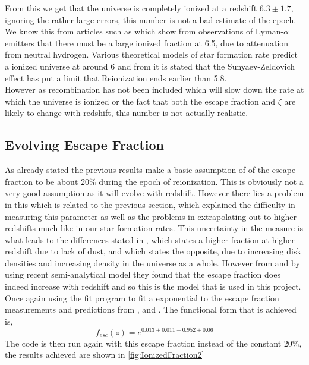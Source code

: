 \documentclass{article}
\begin{document}
From this we get that the universe is completely ionized at a redshift $6.3\pm1.7$, ignoring the rather large errors, this number is not a bad estimate of the epoch. We know this from articles such as \cite{Ota:arXiv0707.1561} which show from observations of Lyman-$\alpha$ emitters that there must be a large ionized fraction at 6.5, due to attenuation from neutral hydrogen. Various theoretical models of star formation rate predict a ionized universe at around 6 and from \cite{2012MNRAS.423..862K} it is stated that the Sunyaev-Zeldovich effect has put a limit that Reionization ends earlier than 5.8.\\
However as recombination has not been included which will slow down the rate at which the universe is ionized or the fact that both the escape fraction and $\zeta$ are likely to change with redshift, this number is not actually realistic.\\

\subsection{Evolving Escape Fraction}
As already stated the previous results make a basic assumption of of the escape fraction to be about $20\%$ during the epoch of reionization. This is obviously not a very good assumption as it will evolve with redshift. However there lies a problem in this which is related to the previous section, 
which explained the difficulty in measuring this parameter as well as the problems in extrapolating out to higher redshifts much like in our star formation rates. This uncertainty in the measure is what leads to the differences stated in \cite{2012ApJ...759L..38A}, which states a higher fraction at higher redshift due to lack of dust, and \cite{2000ApJ...545...86W} which states the opposite, due to increasing disk densities and increasing density in the universe as a whole. However from \cite{2012arXiv1209.2123F} and \cite{2013MNRAS.428L...1M} by using recent semi-analytical model they found that the escape fraction does indeed increase with redshift and so this is the model that is used in this project.\\
Once again using the fit program to fit a exponential to the escape fraction measurements and predictions from \cite{2012ApJ...759L..38A}, \cite{2006ApJ...651L..89R} and \cite{2006MNRAS.371L...1I}. The functional form that is achieved is,
\begin{equation}   
f_{esc}(z)=e^{0.013\pm0.011-0.952\pm0.06}
\end{equation}
The code is then run again with this escape fraction instead of the constant $20\%$, the results achieved are shown in \ref{fig:IonizedFraction2}
\end{document}

